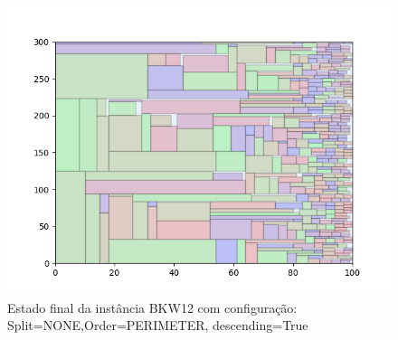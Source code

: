 \begin{figure}[H]
    \centering
    \caption[]{Estado final da instância BKW12 com configuração: Split=NONE,Order=PERIMETER, descending=True}
    \label{fig:bkw12-none-perimeter-true}
    \includegraphics[scale=0.5]{output/figures/bkw/bkw12/none/perimeter/true/000}
\end{figure}
